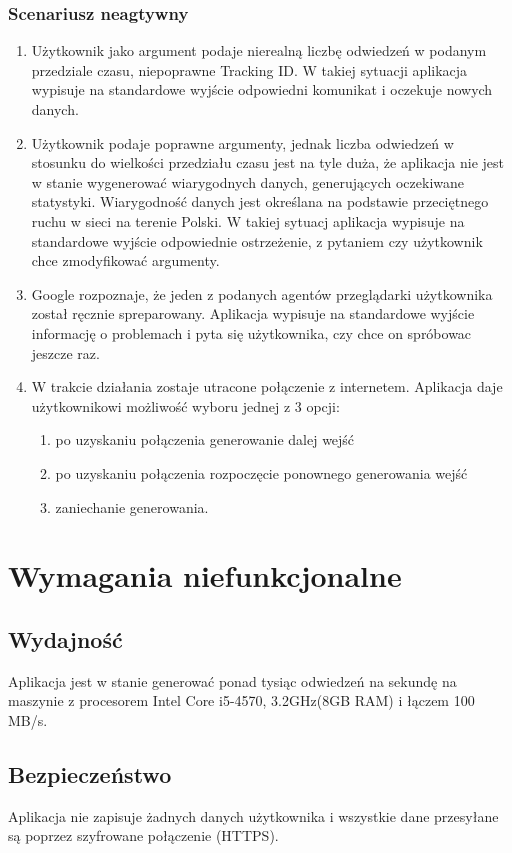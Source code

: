 \documentclass{article}
\begin{document}
\subsubsection{Scenariusz neagtywny}
\begin{enumerate}
	\item Użytkownik jako argument podaje nierealną liczbę odwiedzeń w podanym przedziale czasu, niepoprawne Tracking ID. W takiej sytuacji aplikacja wypisuje na standardowe wyjście odpowiedni komunikat i oczekuje nowych danych.

\item Użytkownik podaje poprawne argumenty, jednak liczba odwiedzeń w stosunku do wielkości przedziału czasu jest na tyle duża, że aplikacja nie jest w stanie wygenerować wiarygodnych danych, generujących oczekiwane statystyki. Wiarygodność danych jest określana na podstawie przeciętnego ruchu w sieci na terenie Polski. W takiej sytuacj aplikacja wypisuje na standardowe wyjście odpowiednie ostrzeżenie, z pytaniem czy użytkownik chce zmodyfikować argumenty.

\item Google rozpoznaje, że jeden z podanych agentów przeglądarki użytkownika został ręcznie spreparowany. Aplikacja wypisuje na standardowe wyjście informację o problemach i pyta się użytkownika, czy 
chce on spróbowac jeszcze raz.

\item W trakcie działania zostaje utracone połączenie z internetem. Aplikacja daje użytkownikowi możliwość wyboru jednej z 3 opcji:
\begin{enumerate}
\item po uzyskaniu połączenia generowanie dalej wejść
\item po uzyskaniu połączenia rozpoczęcie ponownego generowania wejść
\item zaniechanie generowania.
\end{enumerate}

\end{enumerate}

\section{Wymagania niefunkcjonalne}

\subsection{Wydajność}
Aplikacja jest w stanie generować ponad tysiąc odwiedzeń na sekundę na maszynie z procesorem Intel Core i5-4570, 3.2GHz(8GB RAM) i łączem 100 MB/s.

\subsection{Bezpieczeństwo}
Aplikacja nie zapisuje żadnych danych użytkownika i wszystkie dane przesyłane są poprzez szyfrowane połączenie (HTTPS).
\end{document}
